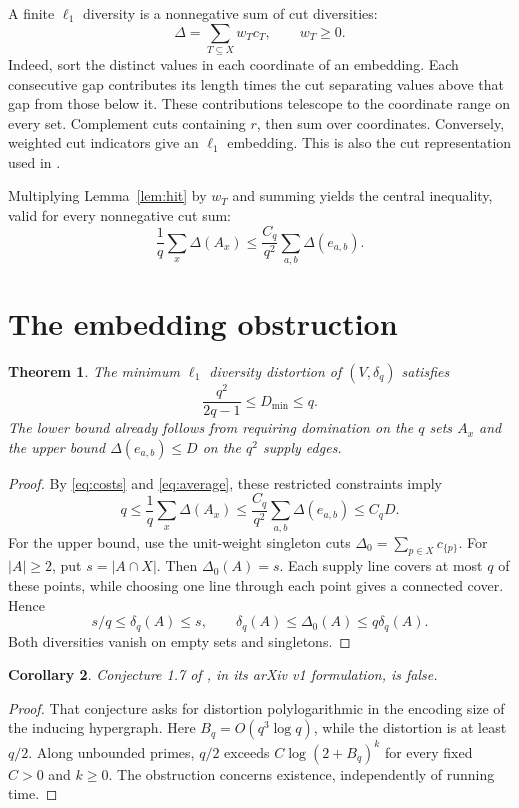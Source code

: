\documentclass[11pt]{article}
\newtheorem{theorem}{Theorem}
\newtheorem{corollary}[theorem]{Corollary}
\begin{document}
A finite $\ell_1$ diversity is a nonnegative sum of cut diversities:
\begin{equation}\label{eq:cuts}
 \Delta=\sum_{T\subseteq X}w_Tc_T,\qquad w_T\ge0.
\end{equation}
Indeed, sort the distinct values in each coordinate of an embedding.
Each consecutive gap contributes its length times the cut separating
values above that gap from those below it. These contributions telescope
to the coordinate range on every set. Complement cuts containing $r$,
then sum over coordinates. Conversely, weighted cut indicators give
an $\ell_1$ embedding. This is also the cut representation used in
\cite{BT,JS}.

Multiplying Lemma~\ref{lem:hit} by $w_T$ and summing yields the central
inequality, valid for every nonnegative cut sum:
\begin{equation}\label{eq:average}
 \frac1q\sum_x\Delta(A_x)
 \le \frac{C_q}{q^2}\sum_{a,b}\Delta(e_{a,b}).
\end{equation}

\section{The embedding obstruction}
\begin{theorem}\label{thm:embedding}
The minimum $\ell_1$ diversity distortion of $(V,\delta_q)$ satisfies
\[
 \frac{q^2}{2q-1}\le D_{\min}\le q.
\]
The lower bound already follows from requiring domination on the $q$
sets $A_x$ and the upper bound $\Delta(e_{a,b})\le D$ on the $q^2$
supply edges.
\end{theorem}
\begin{proof}
By \eqref{eq:costs} and \eqref{eq:average}, these restricted constraints imply
\[
 q\le\frac1q\sum_x\Delta(A_x)
   \le\frac{C_q}{q^2}\sum_{a,b}\Delta(e_{a,b})\le C_qD.
\]
For the upper bound, use the unit-weight singleton cuts
$\Delta_0=\sum_{p\in X}c_{\{p\}}$. For $|A|\ge2$, put $s=|A\cap X|$.
Then $\Delta_0(A)=s$. Each supply line covers at most $q$ of these points,
while choosing one line through each point gives a connected cover. Hence
\[
 s/q\le\delta_q(A)\le s,
 \qquad \delta_q(A)\le\Delta_0(A)\le q\delta_q(A).
\]
Both diversities vanish on empty sets and singletons.
\end{proof}

\begin{corollary}
Conjecture 1.7 of \cite{JS}, in its arXiv v1 formulation, is false.
\end{corollary}
\begin{proof}
That conjecture asks for distortion polylogarithmic in the encoding size
of the inducing hypergraph. Here $B_q=O(q^3\log q)$, while the distortion
is at least $q/2$. Along unbounded primes, $q/2$ exceeds
$C\log(2+B_q)^k$ for every fixed $C>0$ and $k\ge0$.
The obstruction concerns existence, independently of running time.
\end{proof}
\end{document}
